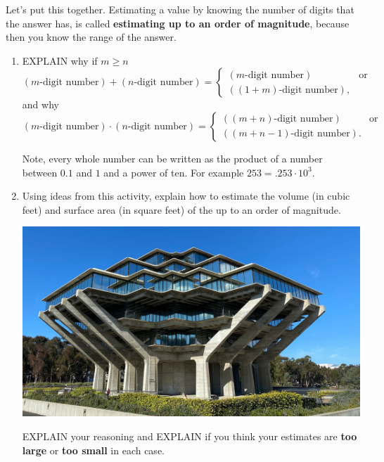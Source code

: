 \documentclass[nooutcomes,noauthor,hints]{ximera}
\begin{document}
\begin{question}
  Let's put this together. Estimating a value by knowing the number
  of digits that the answer has, is called \textbf{estimating up to an
    order of magnitude}, because then you know the range of the
  answer.
  \begin{enumerate}
  \item EXPLAIN why if $m\ge n$
    \[
    (\text{$m$-digit number}) + (\text{$n$-digit number}) =
    \begin{cases}
      (\text{$m$-digit number}) & \text{or}\\
      (\text{$(1+m)$-digit number}),
    \end{cases}
    \]
    and why
    \[
    (\text{$m$-digit number}) \cdot (\text{$n$-digit number}) = \begin{cases}
      (\text{$(m+n)$-digit number}) & \text{or}\\
      (\text{$(m+n-1)$-digit number}).
    \end{cases}
    \]
    \begin{hint}
    Note, every whole number can be written as the product of a number
    between $0.1$ and $1$ and a power of ten. For example $253 =
    .253\cdot 10^3$.
  \end{hint}
  \item Using ideas from this activity, explain how to estimate the
    volume (in cubic feet) and surface area (in square feet) of the  up to an
    order of magnitude.

  \begin{center}
    \includegraphics[width=.4\textwidth]{geisel.jpg} 
  \end{center}

    EXPLAIN your reasoning and EXPLAIN if you
    think your estimates are \textbf{too large} or \textbf{too small}
    in each case.
  \end{enumerate}
  

\end{question}
\end{document}
